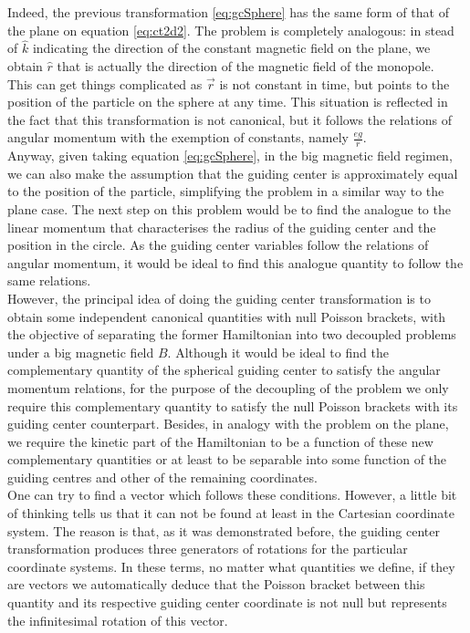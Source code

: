 Indeed, the previous transformation \eqref{eq:gcSphere} has the same form of that of the plane on equation \eqref{eq:ct2d2}. The problem is completely analogous: in stead of $\hat{k}$ indicating the direction of the constant magnetic field on the plane, we obtain $\hat{r}$ that is actually the direction of the magnetic field of the monopole. \\

This can get things complicated as $\vec{r}$ is not constant in time, but points to the position of the particle on the sphere at any time. This situation is reflected in the fact that this transformation is not canonical, but it follows the relations of angular momentum with the exemption of constants, namely $\frac{eg}{r}$.\\

Anyway, given taking equation \eqref{eq:gcSphere}, in the big magnetic field regimen, we can also make the assumption that the guiding center is approximately equal to the position of the particle, simplifying the problem in a similar way to the plane case. The next step on this problem would be to find the analogue to the linear momentum that characterises the radius of the guiding center and the position in the circle. As the guiding center variables follow the relations of angular momentum, it would be ideal to find this analogue quantity to follow the same relations.\\

However, the principal idea of doing the guiding center transformation is to obtain some independent canonical quantities with null Poisson brackets, with the objective of separating the former Hamiltonian into two decoupled problems under a big magnetic field $B$. Although it would be ideal to find the complementary quantity of the spherical guiding center to satisfy the angular momentum relations, for the purpose of the decoupling of the problem we only require this complementary quantity to satisfy the null Poisson brackets with its guiding center counterpart. Besides, in analogy with the problem on the plane, we require the kinetic part of the Hamiltonian to be a function of these new complementary quantities or at least to be separable into some function of the guiding centres and other of the remaining coordinates.\\

One can try to find a vector which follows these conditions. However, a little bit of thinking tells us that it can not be found at least in the Cartesian coordinate system. The reason is that, as it was demonstrated before, the guiding center transformation produces three generators of rotations for the particular coordinate systems. In these terms, no matter what quantities we define, if they are vectors we automatically deduce that the Poisson bracket between this quantity and its respective guiding center coordinate is not null but represents the infinitesimal rotation of this vector.\\

